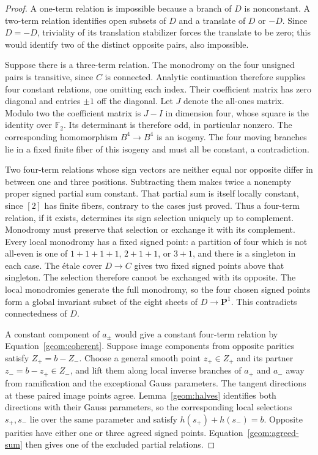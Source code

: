 \documentclass[11pt]{amsart}
\newcommand{\PP}{\mathbf P}
\theoremstyle{definition}
\theoremstyle{remark}
\numberwithin{equation}{section}
\begin{document}
\begin{proof}
A one-term relation is impossible because a branch of $D$ is
nonconstant.  A two-term relation identifies open subsets of $D$
and a translate of $D$ or $-D$.  Since $D=-D$, triviality of its
translation stabilizer forces the translate to be zero; this would
identify two of the distinct opposite pairs, also impossible.

Suppose there is a three-term relation.  The monodromy on the four
unsigned pairs is transitive, since $C$ is connected.  Analytic
continuation therefore supplies four constant relations, one omitting
each index.  Their coefficient matrix has zero diagonal and entries
$\pm1$ off the diagonal.  Let $J$ denote the all-ones matrix.  Modulo two
the coefficient matrix is $J-I$ in dimension four,
whose square is the identity over $\mathbb F_2$.  Its determinant is
therefore odd, in particular nonzero.  The corresponding homomorphism
$B^4\to B^4$ is an isogeny.  The four moving branches lie in a fixed
finite fiber of this isogeny and must all be constant, a contradiction.

Two four-term relations whose sign vectors are neither equal nor
opposite differ in between one and three positions.  Subtracting
them makes twice a nonempty proper signed partial sum constant.
That partial sum is itself locally constant, since $[2]$ has finite
fibers, contrary to the cases just proved.  Thus a four-term relation,
if it exists, determines its sign selection uniquely up to complement.
Monodromy must preserve that selection or exchange it with its
complement.
Every local monodromy has a fixed signed point: a partition of four
which is not all-even is one of $1+1+1+1$, $2+1+1$, or $3+1$, and
there is a singleton in each case.  The étale cover $D\to C$ gives
two fixed signed points above that singleton.  The selection therefore
cannot be exchanged with its opposite.  The local monodromies
generate the full monodromy, so the four chosen signed points form a
global invariant subset of the eight sheets of $D\to\PP^1$.
This contradicts connectedness of $D$.

A constant component of $a_\pm$ would give a constant four-term
relation by Equation~\eqref{geom:coherent}.  Suppose image components
from opposite parities satisfy $Z_+=b-Z_-$.  Choose a general smooth
point $z_+\in Z_+$ and its partner $z_-=b-z_+\in Z_-$, and lift
them along local inverse branches of $a_+$ and $a_-$ away from
ramification and the exceptional Gauss parameters.  The tangent
directions at these paired image points agree.
Lemma~\ref{geom:halves} identifies both directions with their Gauss
parameters, so the corresponding local selections $s_+,s_-$ lie
over the same parameter and satisfy
$h(s_+)+h(s_-)=b$.  Opposite parities have either one or three agreed
signed points.  Equation~\eqref{geom:agreed-sum} then gives one of
the excluded partial relations.
\end{proof}
\end{document}

